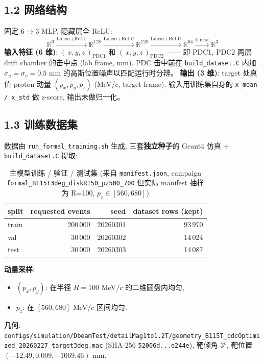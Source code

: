 \documentclass[a4paper,11pt]{article}
\begin{document}
\subsection{1.2 网络结构}
固定 6$\to$3 MLP, 隐藏层全 ReLU:
\[
    \mathbb{R}^6 \xrightarrow{\text{Linear+ReLU}} \mathbb{R}^{128}
    \xrightarrow{\text{Linear+ReLU}} \mathbb{R}^{128}
    \xrightarrow{\text{Linear+ReLU}} \mathbb{R}^{64}
    \xrightarrow{\text{Linear}} \mathbb{R}^{3}
\]
\textbf{输入特征 (6 维)}: $(\,x, y, z\,)_\text{PDC1}$ 和 $(\,x, y, z\,)_\text{PDC2}$ —— 即 PDC1, PDC2 两层 drift chamber 的击中点 (lab frame, mm).
PDC 击中前在 \texttt{build\_dataset.C} 内加 $\sigma_u = \sigma_v = 0.5$ mm 的高斯位置噪声以匹配运行时分辨。
\textbf{输出 (3 维)}: target 处真值 proton 动量 $(p_x, p_y, p_z)$ (MeV/$c$, target frame).
输入用训练集自身的 \texttt{x\_mean / x\_std} 做 z-score, 输出未做归一化。

\subsection{1.3 训练数据集}

数据由 \texttt{run\_formal\_training.sh} 生成, 三套\textbf{独立种子}的 Geant4 仿真 + \texttt{build\_dataset.C} 提取:

\begin{table}[H]
\centering\footnotesize
\caption{主模型训练 / 验证 / 测试集 (来自 \texttt{manifest.json}, campaign \texttt{formal\_B115T3deg\_diskR150\_pz500\_700} 但实际 manifest 抽样为 R=100, $p_z\in[560,680]$)}
\begin{tabular}{lrrr}
\toprule
split & requested events & seed & dataset rows (kept) \\
\midrule
train & 200\,000 & 20260301 & 93\,970 \\
val   & 30\,000  & 20260302 & 14\,024 \\
test  & 30\,000  & 20260303 & 14\,087 \\
\bottomrule
\end{tabular}
\end{table}

\textbf{动量采样}:
\begin{itemize}[nosep]
    \item $(p_x, p_y)$: 在半径 $R = 100$ MeV/$c$ 的二维圆盘内均匀,
    \item $p_z$: 在 $[560, 680]$ MeV/$c$ 区间均匀.
\end{itemize}
\textbf{几何}: \texttt{configs/simulation/DbeamTest/detailMag1to1.2T/geometry\_B115T\_pdcOptimized\_20260227\_target3deg.mac}
(SHA-256 \texttt{52006d...e244e}), 靶倾角 $3°$, 靶位置 $(-12.49, 0.009, -1069.46)$ mm.
\end{document}
